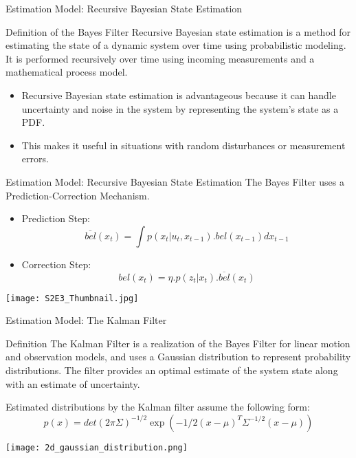 \documentclass{beamer}
\begin{document}
\begin{frame}[t]{Estimation Model: Recursive Bayesian State Estimation
}
\begin{block}{Definition of the Bayes Filter}
Recursive Bayesian state estimation is a method for estimating the state of a dynamic system over time using probabilistic modeling. It is performed recursively over time using incoming measurements and a mathematical process model. 
\end{block}
\begin{itemize}
\item Recursive Bayesian state estimation is advantageous because it can handle uncertainty and noise in the system by representing the system's state as a PDF. 
\item This makes it useful in situations with random disturbances or measurement errors.
\end{itemize}

\end{frame}

\begin{frame}[t]{Estimation Model: Recursive Bayesian State Estimation}
The Bayes Filter uses a Prediction-Correction Mechanism.
\begin{itemize}
\item Prediction Step:
$$\overline{bel}(x_t) = \int p(x_t | u_t, x_{t-1}) .bel(x_{t-1}) dx_{t-1}$$ 
\item Correction Step:
$$bel(x_t) = \eta . p(z_t | x_t) .\overline{bel}(x_t)$$
\end{itemize}
\begin{center}
\texttt{[image: S2E3\_Thumbnail.jpg]}
\end{center}
\end{frame}

\begin{frame}[t]{Estimation Model: The Kalman Filter}
\begin{block}{Definition}
The Kalman Filter is a realization of the Bayes Filter for linear motion and observation models, and uses a Gaussian distribution to represent probability distributions. The filter provides an optimal estimate of the system state along with an estimate of uncertainty.
\end{block}

Estimated distributions by the Kalman filter assume the following form:  
$$p(x) = det(2\pi \Sigma)^{-1/2} \exp \left( -1/2 (x- \mu)^T \Sigma^{-1/2} (x- \mu) \right)$$
\begin{center}
\texttt{[image: 2d\_gaussian\_distribution.png]}
\end{center}
\end{frame}
\end{document}
